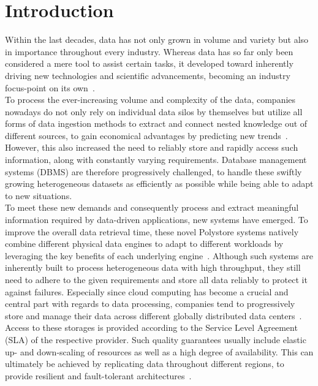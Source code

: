 \chapter{Introduction}
\label{c:intro}

Within the last decades, data has not only grown in volume and variety but also in importance throughout every industry. 
Whereas data has so far only been considered a mere tool to assist certain tasks, it developed toward inherently
driving new technologies and scientific advancements, becoming an industry focus-point on its own~\cite{data-driven_2014}.\\
To process the ever-increasing volume and complexity of the data, companies nowadays do not only rely on individual data silos by themselves but utilize 
all forms of data ingestion methods to extract and connect nested knowledge out of different sources,
to gain economical advantages by predicting new trends~\cite{ingestion_2016}.
However, this also increased the need to reliably store and rapidly access such information, along with constantly varying requirements.
Database management systems (DBMS) are therefore progressively challenged, to handle these swiftly growing heterogeneous datasets as efficiently as possible
while being able to adapt to new situations.\\
To meet these new demands and consequently process and extract meaningful information required by data-driven applications, new systems have emerged.
To improve the overall data retrieval time, these novel Polystore systems natively combine different physical data engines to 
adapt to different workloads by leveraging the key benefits of each underlying engine~\cite{stonebraker:2005, polypheny2020}. 
Although such systems are inherently built to process heterogeneous data with high throughput, they still need to adhere to the given requirements
and store all data reliably to protect it against failures.  
Especially since cloud computing has become a crucial and central part with regards to data processing, 
companies tend to progressively store and manage their data across different globally distributed data centers~\cite{claremont:2005}. 
Access to these storages is provided according to the Service Level Agreement (SLA) of the respective provider.
Such quality guarantees usually include elastic up- and down-scaling of resources as well as a high degree of availability.
This can ultimately be achieved by replicating data throughout different regions, to provide resilient and fault-tolerant architectures~\cite{brinkmann:2015, terry:2013}.\\
